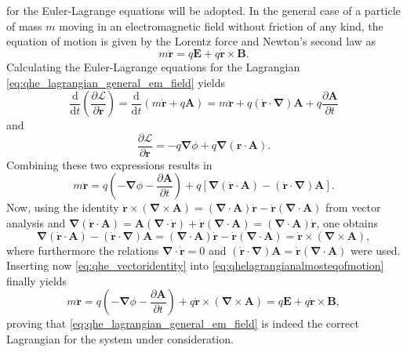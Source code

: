 \documentclass{report}
\numberwithin{tm}{section}
\newcommand\vect[1]{\ensuremath{\bm{#1}}}
\begin{document}
\begin{equation}
	\end{equation} for the Euler-Lagrange equations will be adopted. In the general case of a particle of mass $m$ moving in an electromagnetic field without friction of any kind, the equation of motion is given by the Lorentz force and Newton's second law as \begin{equation}
	m\ddot{\vect{r}} = q\vect{E} + q\dot{\vect{r}}\times \vect{B}.
	\end{equation} Calculating the Euler-Lagrange equations for the Lagrangian \cref{eq:qhe_lagrangian_general_em_field} yields \begin{equation}
	\frac{\mathrm{d}}{\mathrm{d}t}\left(\frac{\partial \mathcal{L}}{\partial \dot{\vect{r}}}\right) = \frac{\mathrm{d}}{\mathrm{d}t}\left(m\dot{\vect{r}} + q\vect{A}\right) = m\ddot{\vect{r}} + q(\dot{\vect{r}}\cdot \vect{\nabla})\vect{A} + q\frac{\partial \vect{A}}{\partial t}
	\end{equation} and \begin{equation}
	\frac{\partial \mathcal{L}}{\partial 
	\vect{r}} = -q\vect{\nabla}\phi + q \vect{\nabla}(\vect{r}\cdot \vect{A}).
	\end{equation} Combining these two expressions results in \begin{equation}\label{eq:qhelagrangianalmosteqofmotion}
	m\ddot{\vect{r}} = q\left(-\vect{\nabla}\phi - \frac{\partial \vect{A}}{\partial t}\right) + q\left[\vect{\nabla}(\dot{\vect{r}}\cdot \vect{A})- (\dot{\vect{r}}\cdot\vect{\nabla}) \vect{A}\right].
	\end{equation} Now, using the identity $\dot{\vect{r}}\times (\vect{\nabla}\times \vect{A}) = (\vect{\nabla}\cdot\vect{A})\dot{\vect{r}} - \dot{\vect{r}}(\vect{\nabla}\cdot \vect{A})$ from vector analysis and $\vect{\nabla}(\dot{\vect{r}}\cdot \vect{A}) = \vect{A}(\vect{\nabla}\cdot \dot{\vect{r}}) + \dot{\vect{r}}(\vect{\nabla}\cdot \vect{A}) = (\vect{\nabla}\cdot\vect{A})\dot{\vect{r}}$, one obtains \begin{equation}\label{eq:qhe_vectoridentity}
	\vect{\nabla}(\dot{\vect{r}}\cdot \vect{A})- (\dot{\vect{r}}\cdot\vect{\nabla}) \vect{A} = (\vect{\nabla}\cdot \vect{A})\dot{\vect{r}} - \dot{\vect{r}}(\vect{\nabla}\cdot \vect{A}) = \dot{\vect{r}}\times (\vect{\nabla}\times \vect{A}),
\end{equation} where furthermore the relations $\vect{\nabla}\cdot \dot{\vect{r}} = 0$ and $(\dot{\vect{r}}\cdot\vect{\nabla})\vect{A} = \dot{\vect{r}}(\vect{\nabla}\cdot \vect{A})$ were used. Inserting now \cref{eq:qhe_vectoridentity} into \cref{eq:qhelagrangianalmosteqofmotion} finally yields \begin{equation}
m\ddot{\vect{r}} = q\left(-\vect{\nabla}\phi-\frac{\partial \vect{A}}{\partial t}\right) + q\dot{\vect{r}}\times (\vect{\nabla}\times \vect{A}) = q\vect{E} + q\dot{\vect{r}}\times \vect{B},
\end{equation} proving that \cref{eq:qhe_lagrangian_general_em_field} is indeed the correct Lagrangian for the system under consideration.
\end{document}
